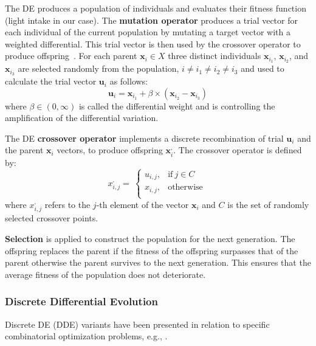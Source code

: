 The DE produces a population of individuals and evaluates their fitness function (light intake in our case). The \textbf{mutation operator} produces a trial vector for each individual of the current population by mutating a target vector with a weighted differential. This trial vector is then used by the crossover operator to produce offspring~\cite{engelbrecht2008computational}. For each parent $\mathbf{x}_{i}\in X$ three distinct individuals $\mathbf{x}_{i_1}$,  $\mathbf{x}_{i_2}$, and $\mathbf{x}_{i_3}$ are selected randomly from the population, $i \neq i_1 \neq i_2 \neq i_3$ and used to calculate the trial vector $\mathbf{u}_i$ as follows:
\begin{equation}
    \mathbf{u}_i = \mathbf{x}_{i_1}+\beta\times (\mathbf{x}_{i_2}-\mathbf{x}_{i_3})
\end{equation}
where $\beta \in (0, \infty )$ is called the differential weight and is controlling the amplification of the differential variation. 

The DE  \textbf{crossover operator} implements a discrete recombination of trial $\mathbf{u}_i$ and the parent $\mathbf{x}_i$ vectors, to produce offspring $\mathbf{x}^{,}_i$. The crossover operator is defined by:
\begin{equation}
     x^{,}_{i,j} = \ \left\{ \begin{matrix}
u_{i,j}, & \mathrm{\text{if}}\ j \in C \\
x_{i,j}, & \mathrm{\text{otherwise}} \\
\end{matrix} \right.\   
\end{equation}
where $x^{,}_{i,j}$ refers to the $j$-th element of the vector $\mathbf{x}_i$ and $C$ is the set of randomly selected crossover points.

\textbf{Selection} is applied to construct the population for the next generation. The offspring replaces the parent if the fitness of the offspring surpasses that of the parent otherwise the parent survives to the next generation. This ensures that the average fitness of the population does not deteriorate.

\subsubsection{Discrete Differential Evolution}
Discrete DE (DDE) variants have been presented in relation to specific
combinatorial optimization problems, e.g., \cite{davendra_flow_2009,pan_discrete_2008,wang_novel_2010}. 

